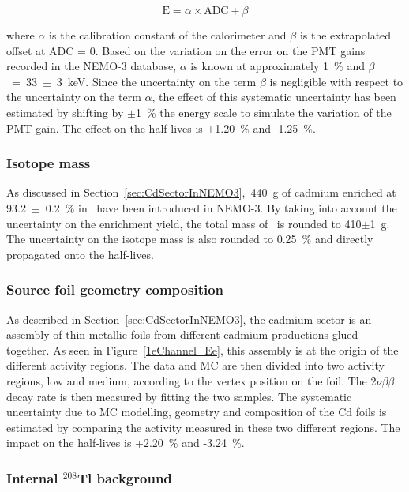 \documentclass[main.tex]{subfiles}
\begin{document}
\begin{equation}
\text{E} = \alpha \times \text{ADC} + \beta
\end{equation} 


\NI where $\alpha$ is the calibration constant of the calorimeter and $\beta$ is the extrapolated offset at ADC = 0. Based on the variation on the error on the PMT gains recorded in the NEMO-3 database, $\alpha$ is known at approximately 1~\% and $\beta$~=~33~$\pm$~3~keV. Since the uncertainty on the term $\beta$ is negligible with respect to the uncertainty on the term $\alpha$, the effect of this systematic uncertainty has been estimated by shifting by $\pm$1~\% the energy scale to simulate the variation of the PMT gain. The effect on the half-lives is +1.20~\% and -1.25~\%.   


\subsubsection{Isotope mass}


\NI As discussed in Section~\ref{sec:CdSectorInNEMO3},~440~g of cadmium enriched at 93.2~$\pm$~0.2~\% in \Cd~have been introduced in NEMO-3. By taking into account the uncertainty on the enrichment yield, the total mass of \Cd ~is rounded to 410$\pm$1~g. The uncertainty on the isotope mass is also rounded to 0.25~\% and directly propagated onto the half-lives. 


\subsubsection{Source foil geometry composition}


\NI As described in Section~\ref{sec:CdSectorInNEMO3}, the cadmium sector is an assembly of thin metallic foils from different cadmium productions glued together. As seen in Figure~\ref{1eChannel_Ee}, this assembly is at the origin of the different activity regions. The data and MC are then divided into two activity regions, low and medium, according to the vertex position on the foil. The 2$\nu\beta\beta$ decay rate is then measured by fitting the two samples. The systematic uncertainty due to MC modelling, geometry and composition of the Cd foils is estimated by comparing the activity measured in these two different regions. The impact on the half-lives is +2.20~\% and -3.24~\%.


\subsubsection{Internal $^{\text{208}}$Tl background}
\end{document}
